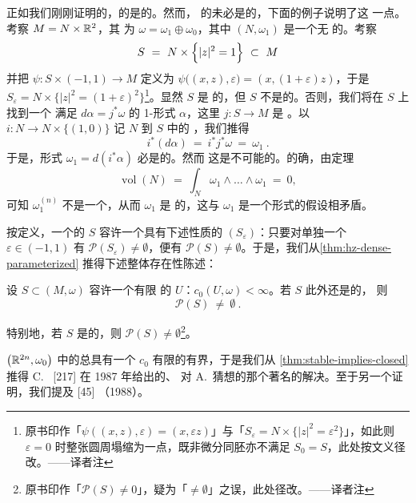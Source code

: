 正如我们刚刚证明的，\trContactType{}的\trHypersurface{}是\trStable{}的。然而，%
\trStable{}的\trHypersurface{}未必是\trContactType{}的，下面的例子说明了这%
一点。考察\trSymplecticManifold{} $M=N\times\mathbb{R}^{2}$，其\trSymplecticStructure{}%
为 $\omega=\omega_{1}\oplus\omega_{0}$，其中 $(N,\omega_{1})$ 是一个无%
\trBoundary{}的\trCompact\trSymplecticManifold。考察\trHypersurface
\[
S\ =\ N\times\Bigl\{|z|^{2}=1\Bigr\}\ \subset\ M
\]
并把\trParametrization{} $\psi:S\times(-1,1)\to M$ 定义为%
$\psi\bigl((x,z),\varepsilon\bigr)=(x,(1+\varepsilon)z)$，于是%
$S_{\varepsilon}=N\times\bigl\{|z|^{2}=(1+\varepsilon)^{2}\bigr\}$\footnote{原书印作「$\psi((x,z),\varepsilon)=(x,\varepsilon z)$」与「$S_{\varepsilon}=N\times\{|z|^{2}=\varepsilon^{2}\}$」，如此则 $\varepsilon=0$ 时整张圆周塌缩为一点，既非微分同胚亦不满足 $S_{0}=S$，此处按文义径改。——译者注}。显然 $S$ 是%
\trStable{}的，但 $S$ 不是\trContactType{}的。否则，我们将在 $S$ 上找到一个%
满足 $d\alpha=j^{*}\omega$ 的 1-形式 $\alpha$，这里 $j:S\to M$ 是%
\trInclusionMapping。以 $i:N\to N\times\bigl\{(1,0)\bigr\}$ 记 $N$ 到 $S$ 中的%
\trInclusionMapping，我们推得
\[
i^{*}(d\alpha)\ =\ i^{*}j^{*}\omega\ =\ \omega_{1}\ .
\]
于是，\trSymplectic{}形式 $\omega_{1}=d(i^{*}\alpha)$ 必是\trExact{}的。然而%
这是不可能的。的确，由\trStokes{}定理
\[
\operatorname{vol}(N)\ =\ \int_{N}\omega_{1}\wedge\ldots\wedge\omega_{1}\ =\ 0,
\]
可知 $\omega_{1}^{(n)}$ 不是一个\trVolumeForm，从而 $\omega_{1}$ 是%
\trDegenerate{}的，这与 $\omega_{1}$ 是一个\trSymplectic{}形式的假设相矛盾。

按定义，一个\trStable{}的\trHypersurface{} $S$ 容许一个具有下述性质的%
\trParameterizedHypersurfaceFamily{} $(S_{\varepsilon})$：只要对单独一个%
$\varepsilon\in(-1,1)$ 有 $\mathcal{P}(S_{\varepsilon})\neq\emptyset$，便有%
$\mathcal{P}(S)\neq\emptyset$。于是，我们从\cref{thm:hz-dense-parameterized}%
推得下述整体存在性陈述：

\begin{theorem}\label{thm:stable-implies-closed}
设\trCompact\trHypersurface{} $S\subset(M,\omega)$ 容许一个\trCapacity{}有限%
的\trNeighborhood{} $U$：$c_{0}(U,\omega)<\infty$。若 $S$ 此外还是\trStable{}的，%
则
\[
\mathcal{P}(S)\ \neq\ \emptyset\ .
\]
\end{theorem}

特别地，若 $S$ 是\trContactType{}的，则 $\mathcal{P}(S)\neq\emptyset$\footnote{原书印作「$\mathcal{P}(S)\neq 0$」，疑为「$\neq\emptyset$」之误，此处径改。——译者注}。

$\bigl(\mathbb{R}^{2n},\omega_{0}\bigr)$ 中的\trCompact\trHypersurface{}总具有一个%
\trCapacity{} $c_{0}$ 有限的有界\trNeighborhood，于是我们从%
\cref{thm:stable-implies-closed}推得 C.~\trViterbo{} [217] 在 1987 年给出的、%
对 A.~\trWeinstein{}猜想的那个著名的解决。至于另一个证明，我们提及 [45]%
（1988）。

